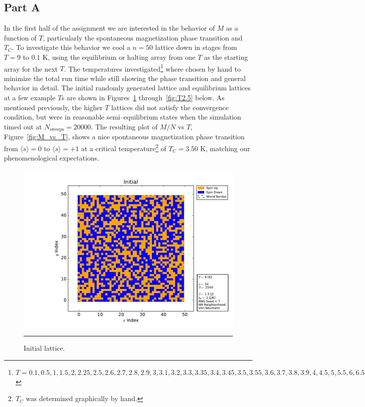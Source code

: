 \documentclass[notitlepage,aps,prd,nofootinbib]{revtex4-1}
\begin{document}
\subsection{Part A}
\label{subsec:results_part_a}
In the first half of the assignment we are interested in the behavior of $M$ as a function of $T$, particularly the spontaneous magnetization phase transition and $T_{C}$. To investigate this behavior we cool a $n=50$ lattice down in stages from $T=9$ to $0.1$ K, using the equilibrium or halting array from one $T$ as the starting array for the next $T$. The temperatures investigated\footnote{$T = 0.1, 0.5, 1, 1.5, 2, 2.25, 2.5, 2.6, 2.7, 2.8, 2.9, 3, 3.1, 3.2, 3.3, 3.35, 3.4, 3.45, 3.5, 3.55, 3.6, 3.7, 3.8, 3.9, 4, 4.5, 5, 5.5, 6, 6.5, 7, 8, 9$} where chosen by hand to minimize the total run time while still showing the phase transition and general behavior in detail. The initial randomly generated lattice and equilibrium lattices at a few example $T$s are shown in Figures~\ref{fig:initial} through~\ref{fig:T2.5} below. As mentioned previously, the higher $T$ lattices did not satisfy the convergence condition, but were in reasonable semi--equilibrium states when the simulation timed out at $N_{\mathrm{sweeps}} = 20000$. The resulting plot of $M/N$ vs $T$, Figure~\ref{fig:M_vs_T}, shows a nice spontaneous magnetization phase transition from $\langle s \rangle = 0$ to $\langle s \rangle = +1$ at a critical temperature\footnote{$T_{C}$ was determined graphically by hand.} of $T_{C} = 3.50$ K, matching our phenomenological expectations.

\begin{figure}[!htbc]
  \centering
  \includegraphics[width=.82\textwidth]{../output/plots_for_paper_von_neumann/part_a/initial.pdf}
	{\par\nobreak\rule[9pt]{35em}{0.5pt}\vspace{-5mm}}
	\caption{Initial lattice.}
	\label{fig:initial}
\end{figure}
\end{document}
